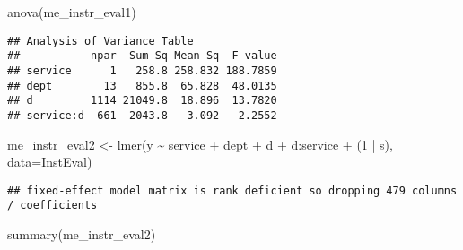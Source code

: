 \documentclass[
]{article}
\newenvironment{Shaded}{\begin{snugshade}}{\end{snugshade}}
\newcommand{\AttributeTok}[1]{\textcolor[rgb]{0.77,0.63,0.00}{#1}}
\newcommand{\DecValTok}[1]{\textcolor[rgb]{0.00,0.00,0.81}{#1}}
\newcommand{\FunctionTok}[1]{\textcolor[rgb]{0.00,0.00,0.00}{#1}}
\newcommand{\NormalTok}[1]{#1}
\newcommand{\OtherTok}[1]{\textcolor[rgb]{0.56,0.35,0.01}{#1}}
\newcommand{\SpecialCharTok}[1]{\textcolor[rgb]{0.00,0.00,0.00}{#1}}
\begin{document}
\begin{Shaded}
\begin{Highlighting}[]
\FunctionTok{anova}\NormalTok{(me\_instr\_eval1)}
\end{Highlighting}
\end{Shaded}

\begin{verbatim}
## Analysis of Variance Table
##           npar  Sum Sq Mean Sq  F value
## service      1   258.8 258.832 188.7859
## dept        13   855.8  65.828  48.0135
## d         1114 21049.8  18.896  13.7820
## service:d  661  2043.8   3.092   2.2552
\end{verbatim}

\begin{Shaded}
\begin{Highlighting}[]
\NormalTok{me\_instr\_eval2 }\OtherTok{\textless{}{-}} \FunctionTok{lmer}\NormalTok{(y }\SpecialCharTok{\textasciitilde{}}\NormalTok{ service }\SpecialCharTok{+}\NormalTok{ dept }\SpecialCharTok{+}\NormalTok{ d }\SpecialCharTok{+}\NormalTok{ d}\SpecialCharTok{:}\NormalTok{service }\SpecialCharTok{+}\NormalTok{ (}\DecValTok{1} \SpecialCharTok{|}\NormalTok{ s), }\AttributeTok{data=}\NormalTok{InstEval)}
\end{Highlighting}
\end{Shaded}

\begin{verbatim}
## fixed-effect model matrix is rank deficient so dropping 479 columns / coefficients
\end{verbatim}

\begin{Shaded}
\begin{Highlighting}[]
\FunctionTok{summary}\NormalTok{(me\_instr\_eval2)}
\end{Highlighting}
\end{Shaded}
\end{document}
